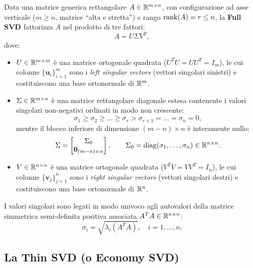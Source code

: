 Data una matrice generica rettangolare $A \in \mathbb{R}^{m \times n}$, con configurazione ad asse verticale ($m \ge n$, matrice ``alta e stretta'') e rango $\operatorname{rank}(A) = r \le n$, la \textbf{Full SVD} fattorizza $A$ nel prodotto di tre fattori:
\begin{equation}
    A = U \Sigma V^T,
\end{equation}
dove:
\begin{itemize}
    \item $U \in \mathbb{R}^{m \times m}$ \`e una matrice ortogonale quadrata ($U^T U = U U^T = I_m$), le cui colonne $\{\mathbf{u}_i\}_{i=1}^m$ sono i \textit{left singular vectors} (vettori singolari sinistri) e costituiscono una base ortonormale di $\mathbb{R}^m$.
    \item $\Sigma \in \mathbb{R}^{m \times n}$ \`e una matrice rettangolare diagonale estesa contenente i valori singolari non-negativi ordinati in modo non crescente:
    \begin{equation}
        \sigma_1 \ge \sigma_2 \ge \dots \ge \sigma_r > \sigma_{r+1} = \dots = \sigma_n = 0,
    \end{equation}
    mentre il blocco inferiore di dimensione $(m - n) \times n$ \`e interamente nullo:
    \begin{equation}
        \Sigma = \begin{bmatrix} \Sigma_0 \\ \mathbf{0}_{(m-n) \times n} \end{bmatrix}, \qquad \Sigma_0 = \operatorname{diag}(\sigma_1, \dots, \sigma_n) \in \mathbb{R}^{n \times n}.
    \end{equation}
    \item $V \in \mathbb{R}^{n \times n}$ \`e una matrice ortogonale quadrata ($V^T V = V V^T = I_n$), le cui colonne $\{\mathbf{v}_j\}_{j=1}^n$ sono i \textit{right singular vectors} (vettori singolari destri) e costituiscono una base ortonormale di $\mathbb{R}^n$.
\end{itemize}

I valori singolari sono legati in modo univoco agli autovalori della matrice simmetrica semi-definita positiva associata $A^T A \in \mathbb{R}^{n \times n}$:
\begin{equation}
    \sigma_i = \sqrt{\lambda_i(A^T A)}, \quad i = 1, \dots, n.
\end{equation}

\subsection{La Thin SVD (o Economy SVD)}

